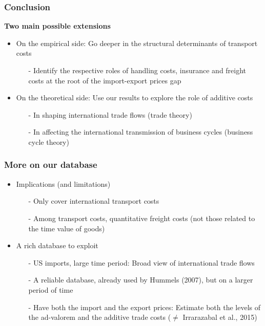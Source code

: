 \documentclass[10 pt,Helvetica, french]{beamer}
\newcommand{\beginbackup}{
   \newcounter{framenumbervorappendix}
   \setcounter{framenumbervorappendix}{\value{framenumber}}
}
\begin{document}
\begin{frame}
\frametitle{Conclusion}

\textbf{Two main possible extensions}
\begin{itemize}
\item On the empirical side: Go deeper in the structural determinants of transport costs \vspace{0.1cm}
\begin{itemize}
\item[-] Identify the respective roles of handling costs, insurance and freight costs at the root of the import-export prices gap \vspace{0.1cm}
\end{itemize}
\item On the theoretical side: Use our results to explore the role of additive costs \vspace{0.1cm}
\begin{itemize}
\item[-] In shaping international trade flows (trade theory) \vspace{0.1cm}
\item[-] In affecting the international transmission of business cycles (business cycle theory)
\end{itemize}
\end{itemize}
\end{frame}

\beginbackup



\appendix
\begin{frame}[label=app_data]
\frametitle{More on our database}
\begin{itemize}
\item Implications (and limitations) \vspace{0.1cm}
\begin{itemize}
\item[-] Only cover international transport costs \vspace{0.1cm}
\item[-] Among transport costs, quantitative freight costs (not those related to the time value of goods) \vspace{0.1cm}
\end{itemize}
\item A rich database to exploit \vspace{0.1cm}
\begin{itemize}
\item[-] US imports, large time period: Broad view of international trade flows \vspace{0.1cm}
\item[-] A reliable database, already used by Hummels (2007), but on a larger period of time \vspace{0.1cm}
\item[-] Have both the import and the export prices: Estimate both the levels of the ad-valorem and the additive trade costs ($\neq$ Irrarazabal et al., 2015)
\end{itemize}
\end{itemize}
\hyperlink{slide_data}{}
\end{frame}
\end{document}
